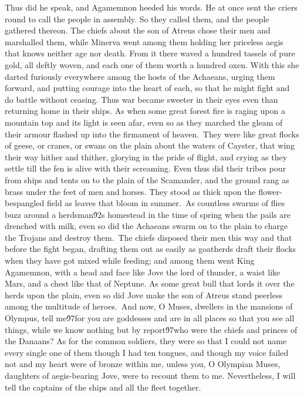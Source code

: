 {Thus did he speak, and Agamemnon heeded his words. He at once sent the criers round to call the people in assembly. So they called them, and the people gathered thereon. The chiefs about the son of Atreus chose their men and marshalled them, while Minerva went among them holding her priceless aegis that knows neither age nor death. From it there waved a hundred tassels of pure gold, all deftly woven, and each one of them worth a hundred oxen. With this she darted furiously everywhere among the hosts of the Achaeans, urging them forward, and putting courage into the heart of each, so that he might fight and do battle without ceasing. Thus war became sweeter in their eyes even than returning home in their ships. As when some great forest fire is raging upon a mountain top and its light is seen afar, even so as they marched the gleam of their armour flashed up into the firmament of heaven.\
They were like great flocks of geese, or cranes, or swans on the plain about the waters of Cayster, that wing their way hither and thither, glorying in the pride of flight, and crying as they settle till the fen is alive with their screaming. Even thus did their tribes pour from ships and tents on to the plain of the Scamander, and the ground rang as brass under the feet of men and horses. They stood as thick upon the flower-bespangled field as leaves that bloom in summer.\
As countless swarms of flies buzz around a herdsman\'92s homestead in the time of spring when the pails are drenched with milk, even so did the Achaeans swarm on to the plain to charge the Trojans and destroy them.\
The chiefs disposed their men this way and that before the fight began, drafting them out as easily as goatherds draft their flocks when they have got mixed while feeding; and among them went King Agamemnon, with a head and face like Jove the lord of thunder, a waist like Mars, and a chest like that of Neptune. As some great bull that lords it over the herds upon the plain, even so did Jove make the son of Atreus stand peerless among the multitude of heroes.\
And now, O Muses, dwellers in the mansions of Olympus, tell me\'97for you are goddesses and are in all places so that you see all things, while we know nothing but by report\'97who were the chiefs and princes of the Danaans? As for the common soldiers, they were so that I could not name every single one of them though I had ten tongues, and though my voice failed not and my heart were of bronze within me, unless you, O Olympian Muses, daughters of aegis-bearing Jove, were to recount them to me. Nevertheless, I will tell the captains of the ships and all the fleet together.\
}
